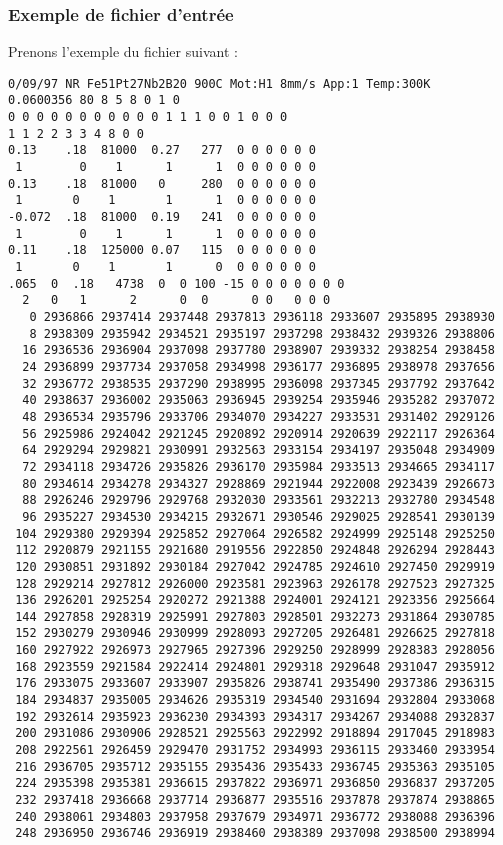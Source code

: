 \subsubsection{Exemple de fichier d'entrée}
Prenons l'exemple du fichier suivant :
\begin{lstlisting}[frame=tbl]
0/09/97 NR Fe51Pt27Nb2B20 900C Mot:H1 8mm/s App:1 Temp:300K
0.0600356 80 8 5 8 0 1 0
0 0 0 0 0 0 0 0 0 0 0 1 1 1 0 0 1 0 0 0
1 1 2 2 3 3 4 8 0 0
0.13    .18  81000  0.27   277  0 0 0 0 0 0 
 1        0    1      1      1  0 0 0 0 0 0
0.13    .18  81000   0     280  0 0 0 0 0 0 
 1       0    1       1      1  0 0 0 0 0 0
-0.072  .18  81000  0.19   241  0 0 0 0 0 0 
 1        0    1      1      1  0 0 0 0 0 0
0.11    .18  125000 0.07   115  0 0 0 0 0 0 
 1       0    1       1      0  0 0 0 0 0 0
.065  0  .18   4738  0  0 100 -15 0 0 0 0 0 0 0
  2   0   1      2      0  0      0 0   0 0 0
   0 2936866 2937414 2937448 2937813 2936118 2933607 2935895 2938930
   8 2938309 2935942 2934521 2935197 2937298 2938432 2939326 2938806
  16 2936536 2936904 2937098 2937780 2938907 2939332 2938254 2938458
  24 2936899 2937734 2937058 2934998 2936177 2936895 2938978 2937656
  32 2936772 2938535 2937290 2938995 2936098 2937345 2937792 2937642
  40 2938637 2936002 2935063 2936945 2939254 2935946 2935282 2937072
  48 2936534 2935796 2933706 2934070 2934227 2933531 2931402 2929126
  56 2925986 2924042 2921245 2920892 2920914 2920639 2922117 2926364
  64 2929294 2929821 2930991 2932563 2933154 2934197 2935048 2934909
  72 2934118 2934726 2935826 2936170 2935984 2933513 2934665 2934117
  80 2934614 2934278 2934327 2928869 2921944 2922008 2923439 2926673
  88 2926246 2929796 2929768 2932030 2933561 2932213 2932780 2934548
  96 2935227 2934530 2934215 2932671 2930546 2929025 2928541 2930139
 104 2929380 2929394 2925852 2927064 2926582 2924999 2925148 2925250
 112 2920879 2921155 2921680 2919556 2922850 2924848 2926294 2928443
 120 2930851 2931892 2930184 2927042 2924785 2924610 2927450 2929919
 128 2929214 2927812 2926000 2923581 2923963 2926178 2927523 2927325
 136 2926201 2925254 2920272 2921388 2924001 2924121 2923356 2925664
 144 2927858 2928319 2925991 2927803 2928501 2932273 2931864 2930785
 152 2930279 2930946 2930999 2928093 2927205 2926481 2926625 2927818
 160 2927922 2926973 2927965 2927396 2929250 2928999 2928383 2928056
 168 2923559 2921584 2922414 2924801 2929318 2929648 2931047 2935912
 176 2933075 2933607 2933907 2935826 2938741 2935490 2937386 2936315
 184 2934837 2935005 2934626 2935319 2934540 2931694 2932804 2933068
 192 2932614 2935923 2936230 2934393 2934317 2934267 2934088 2932837
 200 2931086 2930906 2928521 2925563 2922992 2918894 2917045 2918983
 208 2922561 2926459 2929470 2931752 2934993 2936115 2933460 2933954
 216 2936705 2935712 2935155 2935436 2935433 2936745 2935363 2935105
 224 2935398 2935381 2936615 2937822 2936971 2936850 2936837 2937205
 232 2937418 2936668 2937714 2936877 2935516 2937878 2937874 2938865
 240 2938061 2934803 2937958 2937679 2934971 2936772 2938088 2936396
 248 2936950 2936746 2936919 2938460 2938389 2937098 2938500 2938994
\end{lstlisting}
